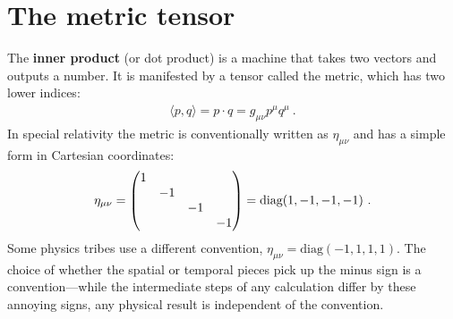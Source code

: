 \documentclass[12pt, oneside]{report}    %
\let\oldsection\section
\def\section{%
  \setcounter{sidenote}{1}%
  \oldsection
}
\begin{document}
\section{The metric tensor}

The \textbf{inner product} (or dot product) is a machine that takes two vectors and outputs a number. It is manifested by a tensor called the metric, which has two lower indices:
\begin{align}
    \langle p,q\rangle = p\cdot q = g_{\mu\nu}p^\mu q^\mu \ .
\end{align}
In special relativity the metric is conventionally written as $\eta_{\mu\nu}$ and has a simple form in Cartesian coordinates:
\begin{align}
    \eta_{\mu\nu} = 
    \begin{pmatrix}
        1 & & & \\
        & -1 & & \\
        & & -1 & \\
        & & & -1
    \end{pmatrix}
    = \textnormal{diag}(1,-1,-1,-1) \ .
\end{align}
Some physics tribes use a different convention, $\eta_{\mu\nu} = \text{diag}(-1,1,1,1)$. The choice of whether the spatial or temporal pieces pick up the minus sign is a convention---while the intermediate steps of any calculation differ by these annoying signs, any physical result is independent of the convention.
\end{document}
